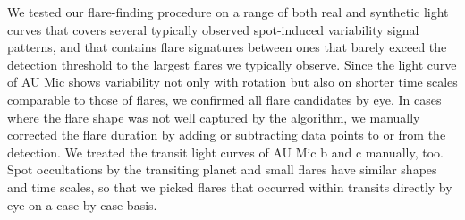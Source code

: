 \documentclass[fleqn,usenatbib]{mnras}%
\begin{document}
We tested our flare-finding procedure on a range of both real and synthetic light curves that covers several typically observed spot-induced variability signal patterns, and that contains flare signatures between ones that barely exceed the detection threshold to the largest flares we typically observe. Since the light curve of AU Mic shows variability not only with rotation but also on shorter time scales comparable to those of flares, we confirmed all flare candidates by eye. In cases where the flare shape was not well captured by the algorithm, we manually corrected the flare duration by adding or subtracting data points to or from the detection. We treated the transit light curves of AU Mic b and c manually, too. Spot occultations by the transiting planet and small flares have similar shapes and time scales, so that we picked flares that occurred within transits directly by eye on a case by case basis. 


\end{document}
